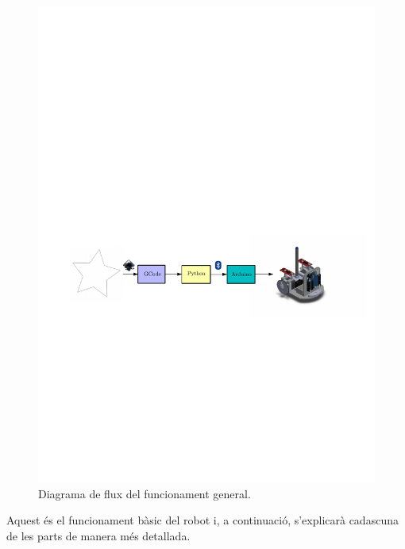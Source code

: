 \begin{figure}[H]
	\centering
	\includegraphics{Flux}
	\caption{Diagrama de flux del funcionament general.}
	\label{fig:flux}
\end{figure}

Aquest és el funcionament bàsic del robot i, a continuació, s'explicarà cadascuna de les parts de manera més detallada. 












